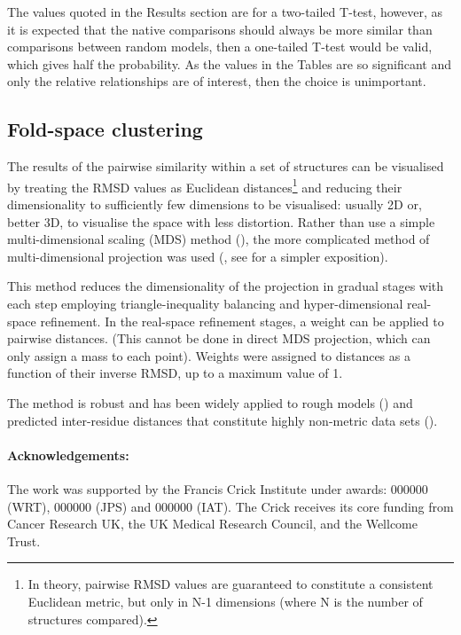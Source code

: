 \documentclass[12pt]{article}
\newcommand{\3}{$3_{10}$}
\begin{document}
The values quoted in the Results section are for a two-tailed T-test, however, as it is expected
that the native comparisons should always be more similar than comparisons between random models,
then a one-tailed T-test would be valid, which gives half the probability.   As the values
in the Tables are so significant and only the relative relationships are of interest,
then the choice is unimportant.

\subsection{Fold-space clustering}

The results of the pairwise similarity within a set of structures can be visualised by treating the
RMSD values as Euclidean distances\footnote{In theory, pairwise RMSD values are guaranteed to constitute 
a consistent Euclidean metric, but only in N-1 dimensions (where N is the number of structures compared).
} and reducing their dimensionality to sufficiently few dimensions to be visualised: usually 2D or, 
better 3D, to visualise the space with less distortion.
Rather than use a simple multi-dimensional scaling (MDS) method (\cite{BrownNPet96}), the more complicated 
method of multi-dimensional projection was used (\cite{AszodiAet97a}, see \cite{TaylorWRet01b} for a
simpler exposition).  

This method reduces the dimensionality of the projection in gradual stages
with each step employing triangle-inequality balancing and hyper-dimensional real-space refinement.
In the real-space refinement stages, a weight can be applied to pairwise distances. (This cannot be
done in direct MDS projection, which can only assign a mass to each point).  
Weights were assigned to distances as a function of their inverse RMSD, up to a maximum value of 1.

The method is robust and
has been widely applied to rough models (\cite{TaylorWRet09a}) and predicted inter-residue distances that 
constitute highly non-metric data sets (\cite{AszodiAet94a}).

\clearpage
\begin{singlespace}


\paragraph{Acknowledgements:}
The work was supported by the Francis Crick Institute under awards: 000000 (WRT), 000000 (JPS) and 000000 (IAT). 
The Crick receives its core funding from Cancer Research UK, the UK Medical Research Council, and the Wellcome Trust.
%
\end{singlespace}
\end{document}
